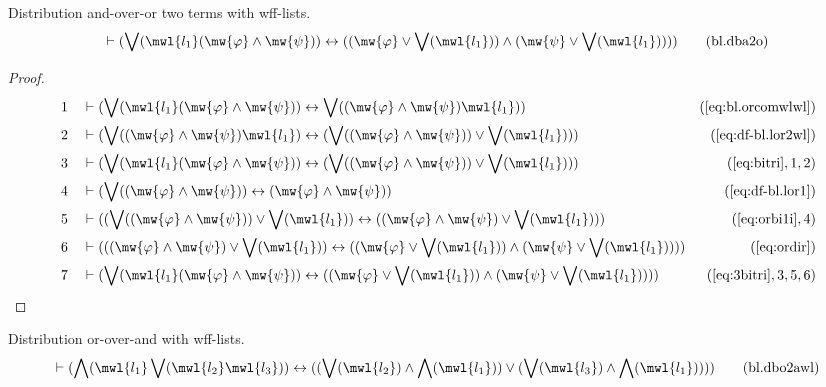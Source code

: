 \begin{lemma} {Distribution and-over-or two terms with
wff-lists.}
\begin{align}
\vdash ( \bigvee( \mwl{l_1} ( \mw{\varphi} \wedge \mw{\psi} ) ) \leftrightarrow
    ( ( \mw{\varphi} \vee \bigvee( \mwl{l_1} ) ) \wedge ( \mw{\psi} \vee
    \bigvee( \mwl{l_1} ) ) ) )\label{eq:bl.dba2o}\tag{bl.dba2o}
\end{align}
\end{lemma}


\begin{proof}
\begin{align}
  1 &&  & \vdash ( \bigvee( \mwl{l_1} ( \mw{\varphi} \wedge \mw{\psi} ) )
     \leftrightarrow \bigvee( ( \mw{\varphi} \wedge
     \mw{\psi} ) \mwl{l_1} )
     )&(\mbox{\ref{eq:bl.orcomwlwl}})\notag
  \\ 2 &&  & \vdash ( \bigvee( ( \mw{\varphi} \wedge \mw{\psi} ) \mwl{l_1} )
     \leftrightarrow ( \bigvee( ( \mw{\varphi} \wedge
     \mw{\psi} ) ) \vee \bigvee( \mwl{l_1} ) )
     )&(\mbox{\ref{eq:df-bl.lor2wl}})\notag
  \\ 3 &&  & \vdash ( \bigvee( \mwl{l_1} ( \mw{\varphi} \wedge \mw{\psi} ) )
     \leftrightarrow ( \bigvee( ( \mw{\varphi} \wedge
     \mw{\psi} ) ) \vee \bigvee( \mwl{l_1} ) )
     )&(\mbox{\ref{eq:bitri}},1,2)\notag
  \\ 4 &&  & \vdash ( \bigvee( ( \mw{\varphi} \wedge \mw{\psi} ) )
     \leftrightarrow ( \mw{\varphi} \wedge \mw{\psi} )
     )&(\mbox{\ref{eq:df-bl.lor1}})\notag
  \\ 5 &&  & \vdash ( ( \bigvee( ( \mw{\varphi} \wedge \mw{\psi} ) ) \vee
     \bigvee( \mwl{l_1} ) ) \leftrightarrow ( (
     \mw{\varphi} \wedge \mw{\psi} ) \vee \bigvee(
     \mwl{l_1} ) ) )&(\mbox{\ref{eq:orbi1i}},4)\notag
  \\ 6 &&  & \vdash ( ( ( \mw{\varphi} \wedge \mw{\psi} ) \vee \bigvee(
     \mwl{l_1} ) ) \leftrightarrow ( ( \mw{\varphi} \vee
     \bigvee( \mwl{l_1} ) ) \wedge ( \mw{\psi} \vee
     \bigvee( \mwl{l_1} ) ) )
     )&(\mbox{\ref{eq:ordir}})\notag
  \\ 7 &&  & \vdash ( \bigvee( \mwl{l_1} ( \mw{\varphi} \wedge \mw{\psi} ) )
     \leftrightarrow ( ( \mw{\varphi} \vee \bigvee(
     \mwl{l_1} ) ) \wedge ( \mw{\psi} \vee \bigvee(
     \mwl{l_1} ) ) )
     )&(\mbox{\ref{eq:3bitri}},3,5,6)\notag
\end{align}
\end{proof}

\begin{lemma} {Distribution or-over-and with wff-lists.}
\begin{align}
\vdash ( \bigwedge( \mwl{l_1} \bigvee( \mwl{l_2} \mwl{l_3} ) ) \leftrightarrow
    ( ( \bigvee( \mwl{l_2} ) \wedge \bigwedge( \mwl{l_1} ) ) \vee ( \bigvee(
    \mwl{l_3} ) \wedge \bigwedge( \mwl{l_1} ) ) )
    )\label{eq:bl.dbo2awl}\tag{bl.dbo2awl}
\end{align}
\end{lemma}


